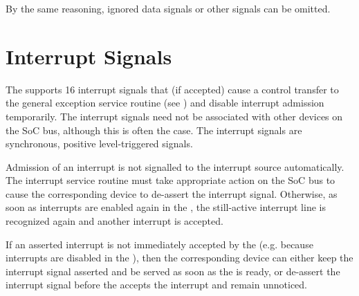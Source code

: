 By the same reasoning, ignored data signals or other signals can be omitted.

\section{Interrupt Signals}

The \eco supports 16 interrupt signals that (if accepted) cause a control transfer to the general exception service routine (see ) and disable interrupt admission temporarily. The interrupt signals need not be associated with other devices on the SoC bus, although this is often the case. The interrupt signals are synchronous, positive level-triggered signals.

Admission of an interrupt is not signalled to the interrupt source automatically. The interrupt service routine must take appropriate action on the SoC bus to cause the corresponding device to de-assert the interrupt signal. Otherwise, as soon as interrupts are enabled again in the \pswx, the still-active interrupt line is recognized again and another interrupt is accepted.

If an asserted interrupt is not immediately accepted by the \eco (e.g. because interrupts are disabled in the \pswx), then the corresponding device can either keep the interrupt signal asserted and be served as soon as the \eco is ready, or de-assert the interrupt signal before the \eco accepts the interrupt and remain unnoticed.
